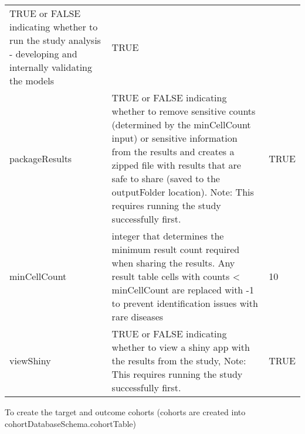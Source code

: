 \documentclass[
]{article}
\begin{document}
\begin{longtable}[]{@{}lll@{}}
\begin{minipage}[t]{0.46\columnwidth}
TRUE or FALSE indicating whether to run the study analysis - developing
and internally validating the models\strut
\end{minipage} & \begin{minipage}[t]{0.24\columnwidth}\raggedright
TRUE\strut
\end{minipage}\tabularnewline
\begin{minipage}[t]{0.21\columnwidth}\raggedright
packageResults\strut
\end{minipage} & \begin{minipage}[t]{0.46\columnwidth}\raggedright
TRUE or FALSE indicating whether to remove sensitive counts (determined
by the minCellCount input) or sensitive information from the results and
creates a zipped file with results that are safe to share (saved to the
outputFolder location). Note: This requires running the study
successfully first.\strut
\end{minipage} & \begin{minipage}[t]{0.24\columnwidth}\raggedright
TRUE\strut
\end{minipage}\tabularnewline
\begin{minipage}[t]{0.21\columnwidth}\raggedright
minCellCount\strut
\end{minipage} & \begin{minipage}[t]{0.46\columnwidth}\raggedright
integer that determines the minimum result count required when sharing
the results. Any result table cells with counts \textless{} minCellCount
are replaced with -1 to prevent identification issues with rare
diseases\strut
\end{minipage} & \begin{minipage}[t]{0.24\columnwidth}\raggedright
10\strut
\end{minipage}\tabularnewline
\begin{minipage}[t]{0.21\columnwidth}\raggedright
viewShiny\strut
\end{minipage} & \begin{minipage}[t]{0.46\columnwidth}\raggedright
TRUE or FALSE indicating whether to view a shiny app with the results
from the study, Note: This requires running the study successfully
first.\strut
\end{minipage} & \begin{minipage}[t]{0.24\columnwidth}\raggedright
TRUE\strut
\end{minipage}\tabularnewline
\bottomrule
\end{longtable}

To create the target and outcome cohorts (cohorts are created into
cohortDatabaseSchema.cohortTable)
\end{document}
